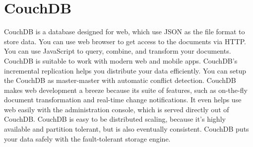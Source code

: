 \section{CouchDB}

CouchDB\cite{hid-sp18-515-www-couchdb} is a database designed for web, 
which use JSON as the file format to store data. You can use web 
browser to get access to the documents via HTTP. You can use JavaScript 
to query, combine, and transform your documents. CouchDB is suitable 
to work with modern web and mobile apps. CouchDB’s incremental replication 
helps you distribute your data efficiently. You can setup the CouchDB 
as master-master with automatic conflict detection. CouchDB makes 
web development a breeze because its suite of features, such as 
on-the-fly document transformation and real-time change notifications. 
It even helps use web easily with the administration console, which 
is served directly out of CouchDB. CouchDB is easy to be distributed 
scaling, because it's highly available and partition tolerant, but 
is also eventually consistent. CouchDB puts your data safely with 
the fault-tolerant storage engine.

